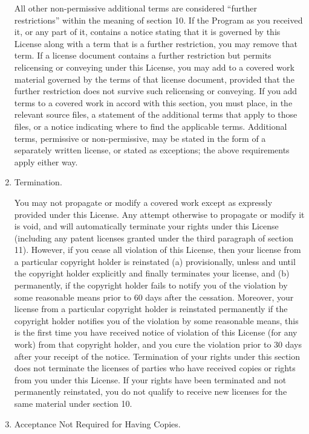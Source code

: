 \documentclass{article}
\begin{document}
\begin{enumerate}[\hspace{-18pt}1.]
\begin{enumerate}
\end{enumerate}
All other non-permissive additional terms are considered ``further restrictions'' within the meaning of section 10.  If the Program as you received it, or any part of it, contains a notice stating that it is governed by this License along with a term that is a further restriction, you may remove that term.  If a license document contains a further restriction but permits relicensing or conveying under this License, you may add to a covered work material governed by the terms of that license document, provided that the further restriction does not survive such relicensing or conveying.
If you add terms to a covered work in accord with this section, you must place, in the relevant source files, a statement of the additional terms that apply to those files, or a notice indicating where to find the applicable terms.
Additional terms, permissive or non-permissive, may be stated in the form of a separately written license, or stated as exceptions; the above requirements apply either way.

\item Termination.

You may not propagate or modify a covered work except as expressly provided under this License.  Any attempt otherwise to propagate or modify it is void, and will automatically terminate your rights under this License (including any patent licenses granted under the third paragraph of section 11).
However, if you cease all violation of this License, then your license from a particular copyright holder is reinstated (a) provisionally, unless and until the copyright holder explicitly and finally terminates your license, and (b) permanently, if the copyright holder fails to notify you of the violation by some reasonable means prior to 60 days after the cessation.
Moreover, your license from a particular copyright holder is reinstated permanently if the copyright holder notifies you of the violation by some reasonable means, this is the first time you have received notice of violation of this License (for any work) from that copyright holder, and you cure the violation prior to 30 days after your receipt of the notice.
Termination of your rights under this section does not terminate the licenses of parties who have received copies or rights from you under this License.  If your rights have been terminated and not permanently reinstated, you do not qualify to receive new licenses for the same material under section 10.

\item Acceptance Not Required for Having Copies.


\end{enumerate}
\end{document}
